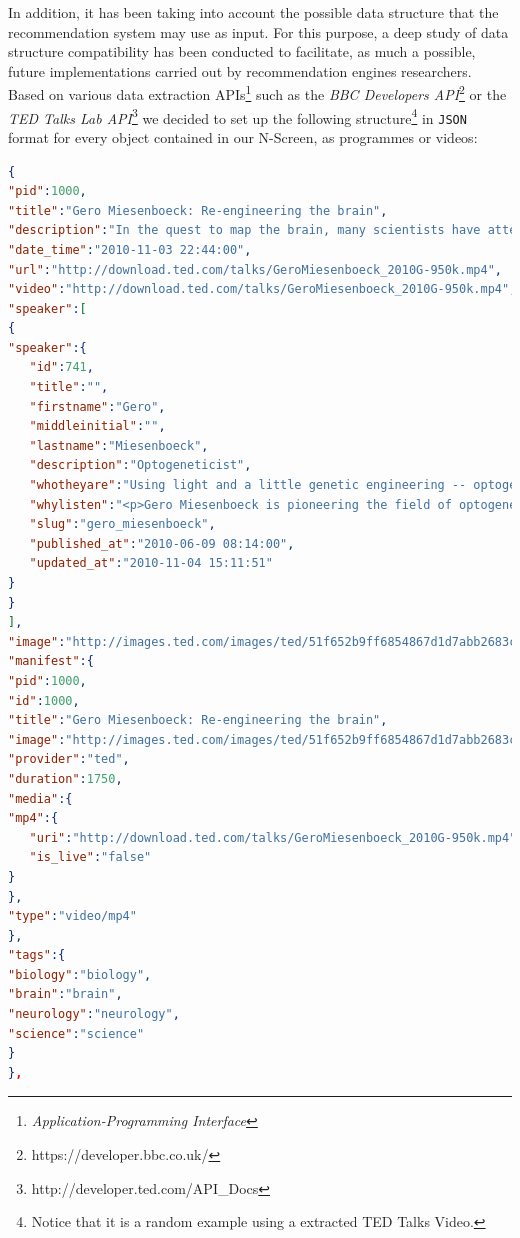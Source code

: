\documentclass{acm_proc_article-sp}
\begin{document}
In addition, it has been taking into account the possible data structure that the recommendation system may use as input. For this purpose, a deep study of data structure compatibility has been conducted to facilitate, as much a possible, future implementations carried out by recommendation engines researchers. Based on various data extraction APIs\footnote{\textit{Application-Programming Interface}} such as the \textit{BBC Developers API}\footnote{https://developer.bbc.co.uk/} or the \textit{TED Talks Lab API}\footnote{http://developer.ted.com/API\_Docs}
we decided to set up the following structure\footnote{Notice that it is a random example using a extracted TED Talks Video.} in \texttt{JSON} format for every object contained in our N-Screen, as programmes or videos:
\begin{lstlisting}[language=json,firstnumber=1]
{
"pid":1000,
"title":"Gero Miesenboeck: Re-engineering the brain",
"description":"In the quest to map the brain, many scientists have attempted the incredibly daunting task of recording the activity of each neuron. Gero Miesenboeck works backward -- manipulating specific neurons to figure out exactly what they do, through a series of stunning experiments that reengineer the way fruit flies percieve light.",
"date_time":"2010-11-03 22:44:00",
"url":"http://download.ted.com/talks/GeroMiesenboeck_2010G-950k.mp4",
"video":"http://download.ted.com/talks/GeroMiesenboeck_2010G-950k.mp4",
"speaker":[
{
"speaker":{
   "id":741,
   "title":"",
   "firstname":"Gero",
   "middleinitial":"",
   "lastname":"Miesenboeck",
   "description":"Optogeneticist",
   "whotheyare":"Using light and a little genetic engineering -- optogenetics -- Gero Miesenboeck has developed a way to control how living nerve cells work, and advanced understanding of how the brain controls behavior.",
   "whylisten":"<p>Gero Miesenboeck is pioneering the field of optogenetics: genetically modifying nerve cells to respond to light. By flashing light at a modified neuron in a living nervous system, Miesenboeck and his collaborators can mimic a brain impulse -- and then study what happens next. Optogenetics will allow ever more precise experiments on living brains, allowing us to gather better evidence on how electrical impulses on tissue translate into actual behavior and thoughts...</p>",
   "slug":"gero_miesenboeck",
   "published_at":"2010-06-09 08:14:00",
   "updated_at":"2010-11-04 15:11:51"
}
}
],
"image":"http://images.ted.com/images/ted/51f652b9ff6854867d1d7abb2683caf1d8dd22fb_240x180.jpg",
"manifest":{
"pid":1000,
"id":1000,
"title":"Gero Miesenboeck: Re-engineering the brain",
"image":"http://images.ted.com/images/ted/51f652b9ff6854867d1d7abb2683caf1d8dd22fb_240x180.jpg",
"provider":"ted",
"duration":1750,
"media":{
"mp4":{
   "uri":"http://download.ted.com/talks/GeroMiesenboeck_2010G-950k.mp4",
   "is_live":"false"
}
},
"type":"video/mp4"
},
"tags":{
"biology":"biology",
"brain":"brain",
"neurology":"neurology",
"science":"science"
}
},
\end{lstlisting}
\end{document}
